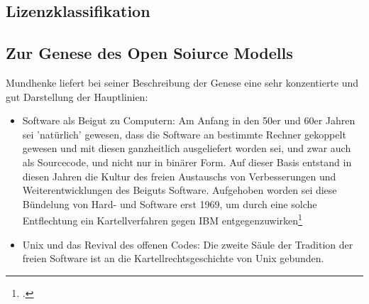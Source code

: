 \documentclass[DIV=calc,BCOR=5mm,11pt,headings=small,oneside,abstract=true, toc=bib]{scrartcl}
\begin{document}
\subsection{Lizenzklassifikation}

\subsection{Zur Genese des \glqq{}Open Soiurce Modells\grqq{}}

Mundhenke liefert bei seiner Beschreibung der Genese eine sehr konzentierte und
gut Darstellung der Hauptlinien:

\begin{itemize}
  \item \glqq{}Software als Beigut zu Computern\grqq{}: Am Anfang in den 50er
  und 60er Jahren sei 'natürlich' gewesen, dass die Software an bestimmte
  Rechner gekoppelt gewesen und mit diesen ganzheitlich ausgeliefert worden sei,
  und zwar auch als Sourcecode, und nicht nur in binärer Form. Auf dieser Basis
  entstand in diesen Jahren die Kultur des freien Austauschs von Verbesserungen
  und Weiterentwicklungen des \glqq{}Beiguts Software\grqq{}. Aufgehoben worden
  sei diese \glqq{}Bündelung von Hard- und Software\grqq{} erst
  \glqq{}1969\grqq{}, um durch eine solche \glqq{}Entflechtung\grqq{} ein
  \glqq{}Kartellverfahren\grqq{} gegen IBM
  entgegenzuwirken\footcite[vgl.][50]{Mundhenke2007a}
  \item \glqq{}Unix und das Revival des offenen Codes\grqq{}: Die zweite Säule
  der Tradition der freien Software ist an die Kartellrechtsgeschichte von Unix
  gebunden.
\end{itemize}

\small

\end{document}
